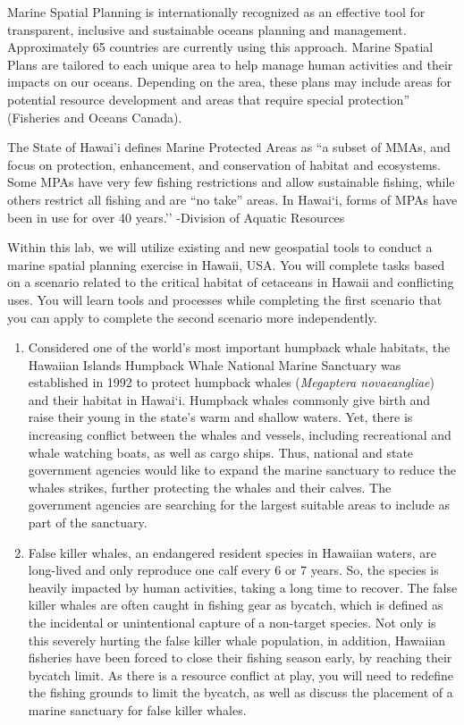 \documentclass[
]{book}
\begin{document}
Marine Spatial Planning is internationally recognized as an effective tool for transparent, inclusive and sustainable oceans planning and management. Approximately 65 countries are currently using this approach. Marine Spatial Plans are tailored to each unique area to help manage human activities and their impacts on our oceans. Depending on the area, these plans may include areas for potential resource development and areas that require special protection'' (Fisheries and Oceans Canada).

The State of Hawai'i defines Marine Protected Areas as ``a subset of MMAs, and focus on protection, enhancement, and conservation of habitat and ecosystems. Some MPAs have very few fishing restrictions and allow sustainable fishing, while others restrict all fishing and are ``no take'' areas. In Hawai`i, forms of MPAs have been in use for over 40 years.'' -Division of Aquatic Resources

Within this lab, we will utilize existing and new geospatial tools to conduct a marine spatial planning exercise in Hawaii, USA. You will complete tasks based on a scenario related to the critical habitat of cetaceans in Hawaii and conflicting uses. You will learn tools and processes while completing the first scenario that you can apply to complete the second scenario more independently.

\begin{enumerate}
\def\labelenumi{\arabic{enumi}.}
\item
  Considered one of the world's most important humpback whale habitats, the Hawaiian Islands Humpback Whale National Marine Sanctuary was established in 1992 to protect humpback whales (\emph{Megaptera novaeangliae}) and their habitat in Hawai`i. Humpback whales commonly give birth and raise their young in the state's warm and shallow waters. Yet, there is increasing conflict between the whales and vessels, including recreational and whale watching boats, as well as cargo ships. Thus, national and state government agencies would like to expand the marine sanctuary to reduce the whales strikes, further protecting the whales and their calves. The government agencies are searching for the largest suitable areas to include as part of the sanctuary.
\item
  False killer whales, an endangered resident species in Hawaiian waters, are long-lived and only reproduce one calf every 6 or 7 years. So, the species is heavily impacted by human activities, taking a long time to recover. The false killer whales are often caught in fishing gear as bycatch, which is defined as the incidental or unintentional capture of a non-target species. Not only is this severely hurting the false killer whale population, in addition, Hawaiian fisheries have been forced to close their fishing season early, by reaching their bycatch limit. As there is a resource conflict at play, you will need to redefine the fishing grounds to limit the bycatch, as well as discuss the placement of a marine sanctuary for false killer whales.
\end{enumerate}
\end{document}
